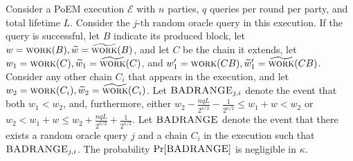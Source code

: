 \begin{lemma}\label{lem:good-ranges}
  Consider a PoEM execution $\mathcal{E}$ with $n$ parties, $q$ queries per round per party,
  and total lifetime $L$.
  Consider the $j$-th random oracle query in this execution.
  If the query is successful, let $B$ indicate its produced block, let
  $w = \textsc{work}(B), \widetilde{w} = \widetilde{\textsc{work}}(B)$, and let $C$ be the
  chain it extends, let $w_1 = \textsc{work}(C), \widetilde{w}_1 = \widetilde{\textsc{work}}(C)$, and
  $w_1' = \textsc{work}(CB), \widetilde{w}_1' = \widetilde{\textsc{work}}(CB)$. Consider any other chain $C_i$ that appears in the
  execution, and let $w_2 = \textsc{work}(C_i), \widetilde{w}_2 = \widetilde{\textsc{work}}(C_i)$.
  Let $\textsc{BADRANGE}_{j,i}$ denote the event that both
  $w_1 < w_2$, and, furthermore, either
  $w_2 - \frac{nqL}{2^{\kappa/2}} - \frac{1}{2^{\kappa/2}} \leq w_1 + w < w_2$ or
  $w_2 < w_1 + w \leq w_2 + \frac{nqL}{2^{\kappa/2}} + \frac{1}{2^{\kappa/2}}$.
  Let $\textsc{BADRANGE}$ denote the event that there exists a random oracle query $j$
  and a chain $C_i$ in the execution such that $\textsc{BADRANGE}_{j,i}$.
  The probability $\Pr[\textsc{BADRANGE}]$ is negligible in $\kappa$.
\end{lemma}
